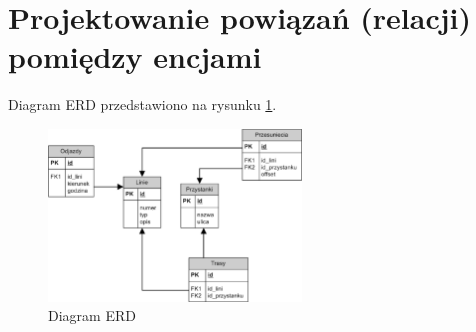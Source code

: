 \section{Projektowanie powiązań (relacji) pomiędzy encjami}


Diagram ERD przedstawiono na rysunku \ref{fig:erd}.

\newpage

\begin{figure}[!htp]
    \centering
    \includegraphics[width=0.6\textwidth]{./img/bus-agenda-erd.eps}
    \caption{Diagram ERD}
    \label{fig:erd}
\end{figure}

